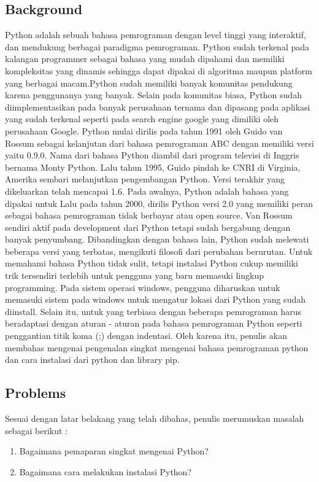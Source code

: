 \subsection{Background}
Python adalah sebuah bahasa pemrograman dengan level tinggi yang interaktif, dan mendukung berbagai paradigma pemrograman. Python sudah terkenal pada kalangan programmer sebagai bahasa yang mudah dipahami dan memiliki kompleksitas yang dinamis sehingga dapat dipakai di algoritma maupun platform yang berbagai macam.Python sudah memiliki banyak komunitas pendukung karena penggunanya yang banyak. Selain pada komunitas biasa, Python sudah diimplementasikan pada banyak perusahaan ternama dan dipasang pada aplikasi yang sudah terkenal seperti pada search engine google yang dimiliki oleh perusahaan Google. 
\linebreak
\linebreak
Python mulai dirilis pada tahun 1991 oleh Guido van Rossum sebagai kelanjutan dari bahasa pemrograman ABC dengan memiliki versi yaitu 0.9.0. Nama dari bahasa Python diambil dari program televisi di Inggris bernama Monty Python. Lalu tahun 1995, Guido pindah ke CNRI di Virginia, Amerika sembari melanjutkan pengembangan Python. Versi terakhir yang dikeluarkan telah mencapai 1.6. Pada awalnya, Python adalah bahasa yang dipakai untuk  Lalu pada tahun 2000, dirilis Python versi 2.0 yang memiliki peran sebagai bahasa pemrograman tidak berbayar atau open source. Van Rossum sendiri aktif pada development dari Python tetapi sudah bergabung dengan banyak penyumbang. Dibandingkan dengan bahasa lain, Python sudah melewati beberapa versi yang terbatas, mengikuti filosofi dari perubahan berurutan. 
\linebreak
\linebreak
Untuk memahami bahasa Python tidak sulit, tetapi instalasi Python cukup memiliki trik tersendiri terlebih untuk pengguna yang baru memasuki lingkup programming. Pada sistem operasi windows, pengguna diharuskan untuk memasuki sistem pada windows untuk mengatur lokasi dari Python yang sudah diinstall. Selain itu, untuk yang terbiasa dengan beberapa pemrograman harus beradaptasi dengan aturan - aturan pada bahasa pemrograman Python seperti penggantian titik koma (;) dengan indentasi. Oleh karena itu, penulis akan membahas mengenai pengenalan singkat mengenai bahasa pemrograman python dan cara instalasi dari python dan library pip.

\subsection{Problems}
Sesuai dengan latar belakang yang telah dibahas, penulis merumuskan masalah sebagai berikut : 
\begin{enumerate}	
	\item Bagaimana pemaparan singkat mengenai Python?
	\item Bagaimana cara melakukan instalasi Python?
\end{enumerate}

